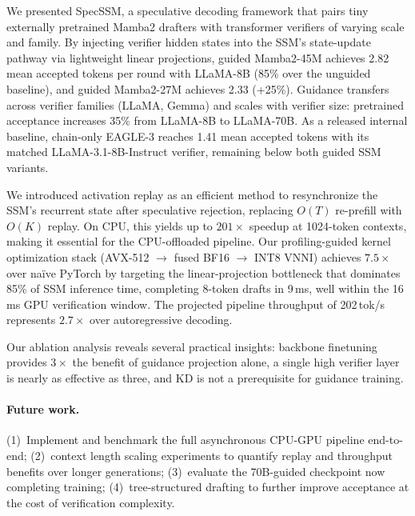 We presented SpecSSM, a speculative decoding framework that pairs tiny externally pretrained Mamba2 drafters with transformer verifiers of varying scale and family.
By injecting verifier hidden states into the SSM's state-update pathway via lightweight linear projections, guided Mamba2-45M achieves 2.82 mean accepted tokens per round with LLaMA-8B (85\% over the unguided baseline), and guided Mamba2-27M achieves 2.33 (+25\%).
Guidance transfers across verifier families (LLaMA, Gemma) and scales with verifier size: pretrained acceptance increases 35\% from LLaMA-8B to LLaMA-70B.
As a released internal baseline, chain-only EAGLE-3 reaches 1.41 mean accepted tokens with its matched LLaMA-3.1-8B-Instruct verifier, remaining below both guided SSM variants.

We introduced activation replay as an efficient method to resynchronize the SSM's recurrent state after speculative rejection, replacing $O(T)$ re-prefill with $O(K)$ replay.
On CPU, this yields up to $201{\times}$ speedup at 1024-token contexts, making it essential for the CPU-offloaded pipeline.
Our profiling-guided kernel optimization stack (AVX-512 $\to$ fused BF16 $\to$ INT8 VNNI) achieves $7.5{\times}$ over na\"ive PyTorch by targeting the linear-projection bottleneck that dominates 85\% of SSM inference time, completing 8-token drafts in 9\,ms, well within the 16\,ms GPU verification window.
The projected pipeline throughput of 202\,tok/s represents $2.7{\times}$ over autoregressive decoding.

Our ablation analysis reveals several practical insights: backbone finetuning provides $3\times$ the benefit of guidance projection alone, a single high verifier layer is nearly as effective as three, and KD is not a prerequisite for guidance training.

\paragraph{Future work.}
(1)~Implement and benchmark the full asynchronous CPU-GPU pipeline end-to-end;
(2)~context length scaling experiments to quantify replay and throughput benefits over longer generations;
(3)~evaluate the 70B-guided checkpoint now completing training;
(4)~tree-structured drafting to further improve acceptance at the cost of verification complexity.
